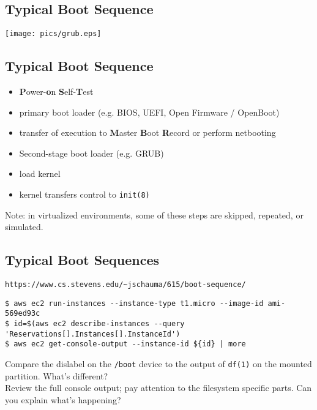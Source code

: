 \documentclass[xga]{xdvislides}
\begin{document}
\subsection{Typical Boot Sequence}
\vspace*{\fill}
\begin{center}
	\texttt{[image: pics/grub.eps]} \\
\end{center}
\vspace*{\fill}


\subsection{Typical Boot Sequence}
\begin{itemize}
	\item {\bf P}ower-{\bf o}n {\bf S}elf-{\bf T}est
	\item primary boot loader (e.g. BIOS, UEFI, Open Firmware / OpenBoot)
	\item transfer of execution to {\bf M}aster {\bf B}oot {\bf R}ecord or perform netbooting
	\item Second-stage boot loader (e.g. GRUB)
	\item load kernel
	\item kernel transfers control to {\tt init(8)}
\end{itemize}
\vspace{.5in}
Note: in virtualized environments, some of these steps
are skipped, repeated, or simulated.

\subsection{Typical Boot Sequences}
\verb+https://www.cs.stevens.edu/~jschauma/615/boot-sequence/+
\vspace*{\fill}
\begin{verbatim}
$ aws ec2 run-instances --instance-type t1.micro --image-id ami-569ed93c
$ id=$(aws ec2 describe-instances --query 'Reservations[].Instances[].InstanceId')
$ aws ec2 get-console-output --instance-id ${id} | more
\end{verbatim}
\vspace{.5in}
Compare the dislabel on the {\tt /boot} device to the
output of {\tt df(1)} on the mounted partition.
What's different? \\

Review the full console output; pay attention to the
filesystem specific parts.  Can you explain what's
happening?
\vspace*{\fill}
\end{document}
